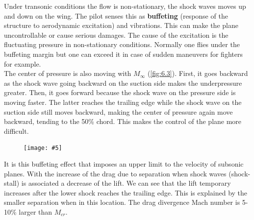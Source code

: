 \documentclass[british,french,11pt, a4paper, openany]{article}
\newcommand{\wrapfig}[6]{%
	\begin{figure}%
		\vspace{-5mm}%
		\texttt{[image: \#5]}%
		\captionof{figure}{}%
		\label{#6}%
	\end{figure}%
}
\begin{document}
Under transonic conditions the flow is non-stationary, the shock waves moves up and down on the wing. The pilot senses this as \textbf{buffeting} (response of the structure to aerodynamic excitation) and vibrations. This can make the plane uncontrollable or cause serious damages. The cause of the excitation is the fluctuating pressure in non-stationary conditions. Normally one flies under the buffeting margin but one can exceed it in case of sudden maneuvers for fighters for example. \\

The center of pressure is also moving with $M_\infty$ (\autoref{fig:6.3}). First, it goes backward as the shock wave going backward on the suction side makes the underpressure greater. Then, it goes forward because the shock wave on the pressure side is moving faster. The latter reaches the trailing edge while the shock wave on the suction side still moves backward, making the center of pressure again move backward, tending to the 50\% chord. This makes the control of the plane more difficult. \\

\wrapfig{7}{l}{5.5}{0.15}{ch6/4}{fig:6.4}
It is this buffeting effect that imposes an upper limit to the velocity of subsonic planes. With the increase of the drag due to separation when shock waves (shock-stall) is associated a decrease of the lift. We can see that the lift temporary increases after the lower shock reaches the trailing edge. This is explained by the smaller separation when in this location. The drag divergence Mach number is 5-10\% larger than $M_{cr}$. 

\ \\
\end{document}
